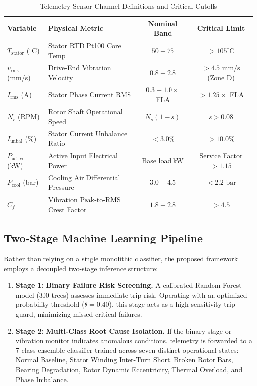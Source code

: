 \documentclass[conference]{IEEEtran}
\begin{document}
\begin{table}[htbp]
\caption{Telemetry Sensor Channel Definitions and Critical Cutoffs}
\label{tab:features}
\centering
\begin{tabular}{llcc}
\toprule
\textbf{Variable} & \textbf{Physical Metric} & \textbf{Nominal Band} & \textbf{Critical Limit} \\
\midrule
$T_{\text{stator}}$ ($^\circ\text{C}$) & Stator RTD Pt100 Core Temp & $50 - 75$ & $> 105^\circ\text{C}$ \\
$v_{\text{rms}}$ (mm/s) & Drive-End Vibration Velocity & $0.8 - 2.8$ & $> 4.5\text{ mm/s}$ (Zone D) \\
$I_{\text{rms}}$ (A) & Stator Phase Current RMS & $0.3 - 1.0\times$ FLA & $> 1.25\times$ FLA \\
$N_r$ (RPM) & Rotor Shaft Operational Speed & $N_s(1 - s)$ & $s > 0.08$ \\
$I_{\text{unbal}}$ (\%) & Stator Current Unbalance Ratio & $< 3.0\%$ & $> 10.0\%$ \\
$P_{\text{active}}$ (kW) & Active Input Electrical Power & Base load kW & Service Factor $> 1.15$ \\
$P_{\text{cool}}$ (bar) & Cooling Air Differential Pressure & $3.0 - 4.5$ & $< 2.2\text{ bar}$ \\
$C_f$ & Vibration Peak-to-RMS Crest Factor & $1.8 - 2.8$ & $> 4.5$ \\
\bottomrule
\end{tabular}
\end{table}

\subsection{Two-Stage Machine Learning Pipeline}
Rather than relying on a single monolithic classifier, the proposed framework employs a decoupled two-stage inference structure:
\begin{enumerate}
    \item \textbf{Stage 1: Binary Failure Risk Screening.} A calibrated Random Forest model (300 trees) assesses immediate trip risk. Operating with an optimized probability threshold ($\theta = 0.40$), this stage acts as a high-sensitivity trip guard, minimizing missed critical failures.
    \item \textbf{Stage 2: Multi-Class Root Cause Isolation.} If the binary stage or vibration monitor indicates anomalous conditions, telemetry is forwarded to a 7-class ensemble classifier trained across seven distinct operational states: Normal Baseline, Stator Winding Inter-Turn Short, Broken Rotor Bars, Bearing Degradation, Rotor Dynamic Eccentricity, Thermal Overload, and Phase Imbalance.
\end{enumerate}
\end{document}
